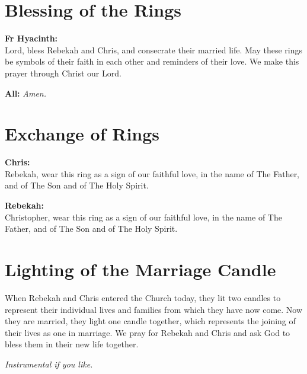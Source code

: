\documentclass[12pt,landscape]{article}
\begin{document}
\begin{multicols}{2}
\columnbreak

\section*{Blessing of the Rings}

\textbf{Fr Hyacinth:}\\
Lord, bless Rebekah and Chris, and consecrate their married life. May these rings be symbols of their faith in each other and reminders of their love. We make this prayer through Christ our Lord.

\vspace{0.5em}

\textbf{All:} \textit{Amen.}

\vspace{1em}

\section*{Exchange of Rings}

\textbf{Chris:}\\
Rebekah, wear this ring as a sign of our faithful love, in the name of The Father, and of The Son and of The Holy Spirit.

\vspace{1em}

\textbf{Rebekah:}\\
Christopher, wear this ring as a sign of our faithful love, in the name of The Father, and of The Son and of The Holy Spirit.

\vspace{1em}

\section*{Lighting of the Marriage Candle}

When Rebekah and Chris entered the Church today, they lit two candles to represent their individual lives and families from which they have now come. Now they are married, they light one candle together, which represents the joining of their lives as one in marriage. We pray for Rebekah and Chris and ask God to bless them in their new life together.

\vspace{1em}

\textit{Instrumental if you like.}

\end{multicols}
\end{document}

